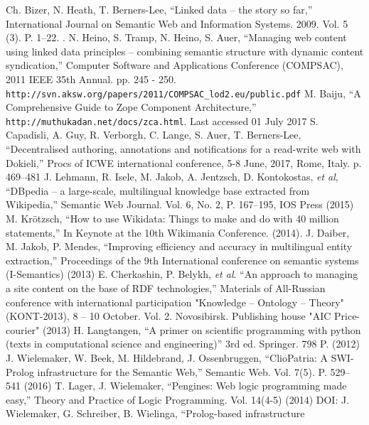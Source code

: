 \documentclass[conference,a4paper]{IEEEtran}
\providecommand\url[1]{\texttt{#1}}
\begin{document}
\begin{thebibliography}{99}
 Ch. Bizer, N. Heath, T. Berners-Lee, ``Linked data -- the story so
  far,'' International Journal on Semantic Web and Information Systems.
  2009. Vol. 5 (3). P. 1--22. .
 N. Heino, S. Tramp, N. Heino, S. Auer, ``Managing web content using linked data principles – combining semantic structure with dynamic content syndication,'' Computer Software and Applications Conference (COMPSAC), 2011 IEEE 35th Annual. pp. 245 - 250.  \url{http://svn.aksw.org/papers/2011/COMPSAC_lod2.eu/public.pdf}
  M. Baiju, ``A Comprehensive Guide to Zope Component Architecture,''
\url{http://muthukadan.net/docs/zca.html}. Last accessed 01 July 2017
  S. Capadisli, A. Guy, R. Verborgh, C. Lange, S. Auer, T. Berners-Lee, ``Decentralised authoring, annotations and notifications for a read-write web with Dokieli,'' Procs of ICWE international conference, 5-8 June, 2017, Rome, Italy. p. 469--481 
  J. Lehmann, R. Isele, M. Jakob, A. Jentzsch, D. Kontokostas, \textit{et al},
  ``DBpedia -- a large-scale, multilingual knowledge base extracted from
  Wikipedia,'' Semantic Web Journal. Vol. 6, No. 2, P. 167--195,
  IOS Press (2015)
  M. Krötzsch, ``How to use Wikidata: Things to make and do with 40 million
  statements,'' In Keynote at the 10th Wikimania Conference. (2014).
  J. Daiber, M. Jakob, P. Mendes, ``Improving efficiency and accuracy in
  multilingual entity extraction,'' Proceedings of the 9th International
  conference on semantic systems (I-Semantics) (2013)
  E. Cherkashin, P. Belykh, \textit{et al}. ``An approach to managing a site
  content on the base of RDF technologies,'' Materials of All-Russian
  conference with international participation "Knowledge -- Ontology --
  Theory" (KONT-2013), 8 -- 10 October. Vol. 2. Novosibirsk.
  Publishing house "AIC Price-courier" (2013)
  H. Langtangen, ``A primer on scientific programming with python (texts in
  computational science and engineering)'' 3rd ed. Springer. 798 P. (2012)
  J. Wielemaker, W. Beek, M. Hildebrand, J. Ossenbruggen, ``ClioPatria: A
  SWI-Prolog infrastructure for the Semantic Web,'' Semantic Web.
  Vol. 7(5). P. 529--541 (2016) 
  T. Lager, J. Wielemaker, ``Pengines: Web logic programming made easy,''
  Theory and Practice of Logic Programming. Vol. 14(4-5) (2014)
DOI: 
  J. Wielemaker, G. Schreiber, B. Wielinga, ``Prolog-based infrastructure

\end{thebibliography}
\end{document}

